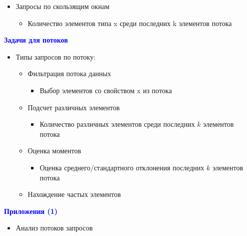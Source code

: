 \documentclass[landscape]{slides}
\begin{document}
\begin{normalsize}
\begin{slide}
\begin{itemize}
\begin{itemize}
  \item Запросы по скользящим окнам

    \begin{itemize}
    \item Количество элементов типа x среди последних k элементов потока
    \end{itemize}
  \end{itemize}
\end{itemize}
\end{slide}


\begin{slide}
\textbf{\textcolor{blue}{Задачи для потоков}}

\begin{itemize}
\item Типы запросов по потоку:

  \begin{itemize}
  \item Фильтрация потока данных

    \begin{itemize}
    \item Выбор элементов со свойством x из потока
    \end{itemize}

  \item Подсчет различных элементов

    \begin{itemize}
    \item Количество различных элементов среди последних $k$ элементов потока
    \end{itemize}

  \item Оценка моментов

    \begin{itemize}
    \item Оценка среднего/стандартного отклонения последних $k$ элементов потока
    \end{itemize}

  \item Нахождение частых элементов
  \end{itemize}
\end{itemize}
\end{slide}


\begin{slide}
\textbf{\textcolor{blue}{Приложения (1)}}

\begin{itemize}
\item Анализ потоков запросов


\end{itemize}
\end{slide}
\end{normalsize}
\end{document}
